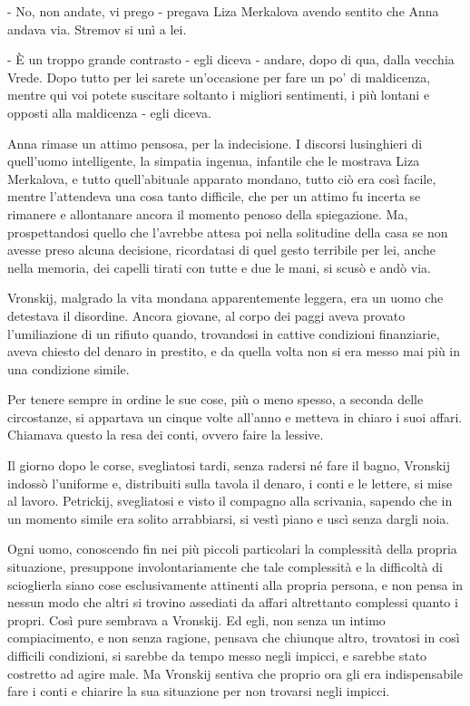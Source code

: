 - No, non andate, vi prego - pregava Liza Merkalova avendo sentito che Anna andava via. Stremov si unì a lei. 

- È un troppo grande contrasto - egli diceva - andare, dopo di qua, dalla vecchia Vrede. Dopo tutto per lei sarete un'occasione per fare un po' di maldicenza, mentre qui voi potete suscitare soltanto i migliori sentimenti, i più lontani e opposti alla maldicenza - egli diceva. 

Anna rimase un attimo pensosa, per la indecisione. I discorsi lusinghieri di quell'uomo intelligente, la simpatia ingenua, infantile che le mostrava Liza Merkalova, e tutto quell'abituale apparato mondano, tutto ciò era così facile, mentre l'attendeva una cosa tanto difficile, che per un attimo fu incerta se rimanere e allontanare ancora il momento penoso della spiegazione. Ma, prospettandosi quello che l'avrebbe attesa poi nella solitudine della casa se non avesse preso alcuna decisione, ricordatasi di quel gesto terribile per lei, anche nella memoria, dei capelli tirati con tutte e due le mani, si scusò e andò via. 

Vronskij, malgrado la vita mondana apparentemente leggera, era un uomo che detestava il disordine. Ancora giovane, al corpo dei paggi aveva provato l'umiliazione di un rifiuto quando, trovandosi in cattive condizioni finanziarie, aveva chiesto del denaro in prestito, e da quella volta non si era messo mai più in una condizione simile. 

Per tenere sempre in ordine le sue cose, più o meno spesso, a seconda delle circostanze, si appartava un cinque volte all'anno e metteva in chiaro i suoi affari. Chiamava questo la resa dei conti, ovvero faire la lessive. 

Il giorno dopo le corse, svegliatosi tardi, senza radersi né fare il bagno, Vronskij indossò l'uniforme e, distribuiti sulla tavola il denaro, i conti e le lettere, si mise al lavoro. Petrickij, svegliatosi e visto il compagno alla scrivania, sapendo che in un momento simile era solito arrabbiarsi, si vestì piano e uscì senza dargli noia. 

Ogni uomo, conoscendo fin nei più piccoli particolari la complessità della propria situazione, presuppone involontariamente che tale complessità e la difficoltà di scioglierla siano cose esclusivamente attinenti alla propria persona, e non pensa in nessun modo che altri si trovino assediati da affari altrettanto complessi quanto i propri. Così pure sembrava a Vronskij. Ed egli, non senza un intimo compiacimento, e non senza ragione, pensava che chiunque altro, trovatosi in così difficili condizioni, si sarebbe da tempo messo negli impicci, e sarebbe stato costretto ad agire male. Ma Vronskij sentiva che proprio ora gli era indispensabile fare i conti e chiarire la sua situazione per non trovarsi negli impicci. 

